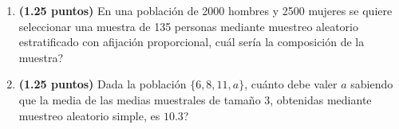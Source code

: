 
\begin{enumerate}[label=\alph*)]
\item \textbf{(1.25 puntos)} En una población de 2000 hombres y 2500 mujeres se quiere seleccionar una muestra de 135 personas mediante muestreo aleatorio estratificado con afijación proporcional, \textquestiondown{}cuál sería la composición de la muestra?
\item \textbf{(1.25 puntos)} Dada la población $\{6,8,11,a\}$, \textquestiondown{}cuánto debe valer $a$ sabiendo que la media de las medias muestrales de tamaño 3, obtenidas mediante muestreo aleatorio simple, es $10.3$?
\end{enumerate}
